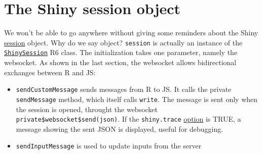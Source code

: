 \documentclass[]{book}
\providecommand{\tightlist}{%
  \setlength{\itemsep}{0pt}\setlength{\parskip}{0pt}}
\begin{document}
\hypertarget{the-shiny-session-object}{%
\section{The Shiny session object}\label{the-shiny-session-object}}

We won't be able to go anywhere without giving some reminders about the Shiny \href{https://shiny.rstudio.com/reference/shiny/1.4.0/session.html}{session} object.
Why do we say object? \texttt{session} is actually an instance of the \href{https://github.com/rstudio/shiny/blob/master/R/shiny.R}{\texttt{ShinySession}} R6 class.
The initialization takes one parameter, namely the websocket. As shown in the last section, the websocket allows bidirectional exchanges between R and JS:

\begin{itemize}
\tightlist
\item
  \texttt{sendCustomMessage} sends messages from R to JS. It calls the private \texttt{sendMessage} method, which itself calls \texttt{write}. The message is sent only when the session is opened, throught the websocket \texttt{private\$websocket\$send(json)}. If the \texttt{shiny.trace} \href{https://shiny.rstudio.com/reference/shiny/0.14/shiny-options.html}{option} is TRUE, a message showing the sent JSON is displayed, useful for debugging.
\item
  \texttt{sendInputMessage} is used to update inputs from the server
\end{itemize}
\end{document}
